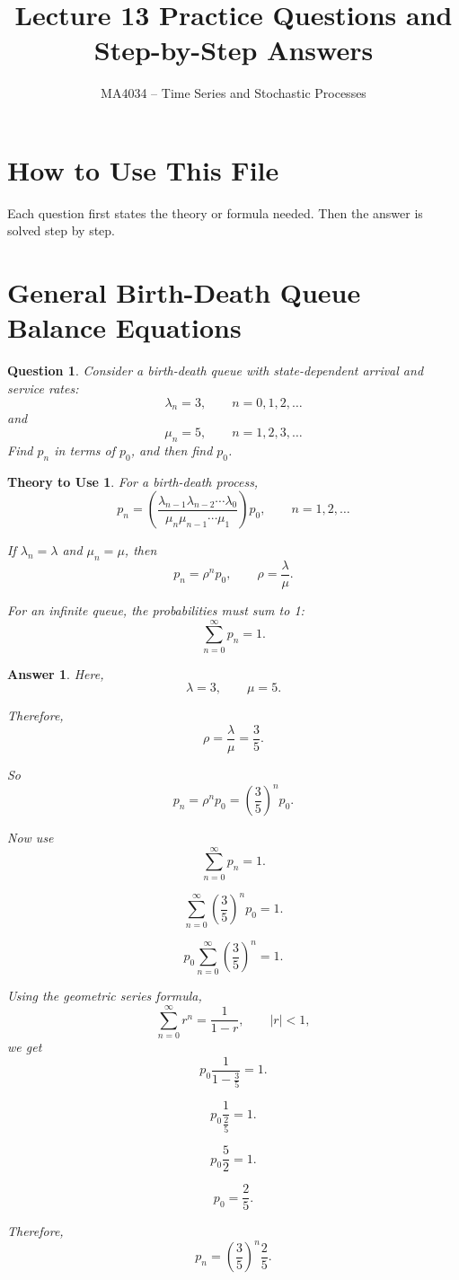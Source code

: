 \documentclass[12pt]{article}
\title{Lecture 13 Practice Questions and Step-by-Step Answers}
\author{MA4034 -- Time Series and Stochastic Processes}
\date{}
\newtheorem{question}{Question}
\newtheorem*{theory}{Theory to Use}
\newtheorem*{answer}{Answer}
\begin{document}
\maketitle

\section*{How to Use This File}

Each question first states the theory or formula needed. Then the answer is solved step by step.

\section{General Birth-Death Queue Balance Equations}

\begin{question}
Consider a birth-death queue with state-dependent arrival and service rates:
\[
\lambda_n=3,\qquad n=0,1,2,\ldots
\]
and
\[
\mu_n=5,\qquad n=1,2,3,\ldots
\]
Find \(p_n\) in terms of \(p_0\), and then find \(p_0\).
\end{question}

\begin{theory}
For a birth-death process,
\[
p_n=
\left(
\frac{\lambda_{n-1}\lambda_{n-2}\cdots \lambda_0}
{\mu_n\mu_{n-1}\cdots \mu_1}
\right)p_0,
\qquad n=1,2,\ldots
\]

If \(\lambda_n=\lambda\) and \(\mu_n=\mu\), then
\[
p_n=\rho^n p_0,
\qquad
\rho=\frac{\lambda}{\mu}.
\]

For an infinite queue, the probabilities must sum to 1:
\[
\sum_{n=0}^{\infty}p_n=1.
\]
\end{theory}

\begin{answer}
Here,
\[
\lambda=3,\qquad \mu=5.
\]

Therefore,
\[
\rho=\frac{\lambda}{\mu}=\frac{3}{5}.
\]

So
\[
p_n=\rho^n p_0
=\left(\frac{3}{5}\right)^n p_0.
\]

Now use
\[
\sum_{n=0}^{\infty}p_n=1.
\]

\[
\sum_{n=0}^{\infty}\left(\frac{3}{5}\right)^n p_0=1.
\]

\[
p_0\sum_{n=0}^{\infty}\left(\frac{3}{5}\right)^n=1.
\]

Using the geometric series formula,
\[
\sum_{n=0}^{\infty}r^n=\frac{1}{1-r},\qquad |r|<1,
\]
we get
\[
p_0\frac{1}{1-\frac{3}{5}}=1.
\]

\[
p_0\frac{1}{\frac{2}{5}}=1.
\]

\[
p_0\frac{5}{2}=1.
\]

\[
p_0=\frac{2}{5}.
\]

Therefore,
\[
\boxed{p_n=\left(\frac{3}{5}\right)^n\frac{2}{5}.}
\]
\end{answer}
\end{document}
